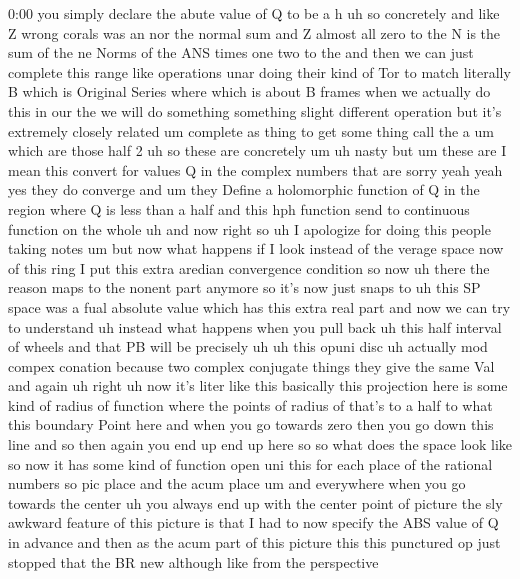 \begin{unfinished}{0:00}
you  simply  declare  the  abute  value  of  Q
to  be  a
h  uh  so
concretely  and  like
Z  wrong
corals  was  an
nor
the  normal
sum  and  Z  almost  all  zero  to  the  N  is
the  sum  of  the  ne  Norms  of  the
ANS  times  one  two  to
the  and  then  we  can  just  complete  this
range
like  operations  unar  doing  their  kind  of
Tor  to  match  literally  B  which  is
Original  Series  where  which  is  about  B
frames  when  we  actually  do  this  in  our
the  we  will  do  something  something
slight  different  operation  but  it's
extremely  closely  related  um  complete
as
thing
to  get  some  thing  call
the
a
um  which
are
those  half
2
uh  so  these  are  concretely
um
uh  nasty  but
um  these  are  I  mean  this
convert
for  values  Q  in  the  complex
numbers  that
are  sorry  yeah  yeah  yes  they  do
converge  and  um  they  Define  a
holomorphic  function  of  Q  in  the  region
where  Q  is  less  than  a  half  and  this  hph
function  send  to  continuous  function  on
the  whole
uh  and
now  right  so  uh  I  apologize  for  doing
this  people  taking  notes  um  but  now  what
happens  if  I  look  instead  of  the  verage
space  now  of  this  ring  I  put  this  extra
aredian  convergence
condition  so  now  uh  there  the  reason
maps  to  the  nonent  part  anymore  so  it's
now  just  snaps
to  uh  this  SP  space  was  a  fual  absolute
value  which  has  this  extra  real  part  and
now  we  can  try  to
understand
uh
instead  what  happens  when  you  pull
back
uh  this  half  interval  of
wheels  and  that  PB  will  be
precisely
uh  uh  this  opuni
disc  uh  actually  mod  compex  conation
because  two  complex  conjugate  things
they  give  the  same
Val  and  again
uh  right  uh  now  it's  liter  like  this
basically  this  projection  here  is  some
kind  of  radius  of  function  where  the
points  of  radius  of
that's  to  a  half  to  what  this  boundary
Point  here  and  when  you  go  towards  zero
then  you  go  down  this  line  and  so  then
again  you  end  up  end  up
here  so  so  what  does  the  space  look  like
so  now  it  has  some  kind  of  function  open
uni  this  for  each  place  of  the  rational
numbers  so  pic  place  and  the  acum  place
um  and  everywhere  when  you  go  towards
the  center  uh  you  always  end  up  with  the
center  point  of  picture
the  sly  awkward  feature  of  this  picture
is  that  I  had  to  now  specify  the  ABS
value  of  Q  in  advance  and  then  as  the
acum  part  of  this  picture  this  this
punctured  op  just  stopped  that  the  BR
new  although  like  from  the  perspective

\end{unfinished}
